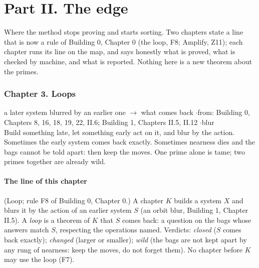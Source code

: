 
\part*{Part II. The edge}

Where the method stops proving and starts sorting. Two chapters state a line that is now a rule of Building 0, Chapter 0 (the loop, F8; Amplify, Z11); each chapter runs its line on the map, and says honestly what is proved, what is checked by machine, and what is reported. Nothing here is a new theorem about the primes.

\section*{Chapter 3. Loops}
\begin{center}
{\normalsize a later system blurred by an earlier one $\to$ what comes back \quad$\cdot$\quad from: Building 0, Chapters 8, 16, 18, 19, 22, II.6; Building 1, Chapters II.5, II.12 \quad$\cdot$\quad blur}\\[4pt]
{\small Build something late, let something early act on it, and blur by the action. Sometimes the early system comes back exactly. Sometimes nearness dies and the bags cannot be told apart: then keep the moves. One prime alone is tame; two primes together are already wild.}
\end{center}

\subsection*{The line of this chapter}

\begin{lines}
\item[\lab{L}] (Loop; rule F8 of Building 0, Chapter 0.) A chapter $K$ builds a system $X$ and blurs it by the action of an earlier system $S$ (an orbit blur, Building 1, Chapter II.5). A \emph{loop} is a theorem of $K$ that $S$ comes back: a question on the bags whose answers match $S$, respecting the operations named. Verdicts: \emph{closed} ($S$ comes back exactly); \emph{changed} (larger or smaller); \emph{wild} (the bags are not kept apart by any rung of nearness: keep the moves, do not forget them). No chapter before $K$ may use the loop (F7).
\end{lines}

